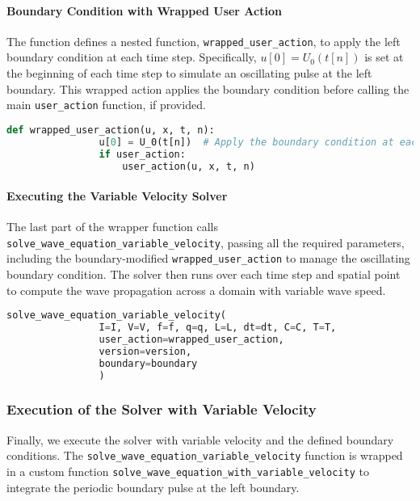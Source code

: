 \documentclass{article}
\begin{document}
		\paragraph{Boundary Condition with Wrapped User Action}
		
		The function defines a nested function, \texttt{wrapped\_user\_action}, to apply the left boundary condition at each time step. Specifically, \( u[0] = U_0(t[n]) \) is set at the beginning of each time step to simulate an oscillating pulse at the left boundary. This wrapped action applies the boundary condition before calling the main \texttt{user\_action} function, if provided.
		
		\begin{lstlisting}[language=Python]
			def wrapped_user_action(u, x, t, n):
				u[0] = U_0(t[n])  # Apply the boundary condition at each time step
				if user_action:
					user_action(u, x, t, n)
		\end{lstlisting}
		
		\paragraph{Executing the Variable Velocity Solver}
		
		The last part of the wrapper function calls \texttt{solve\_wave\_equation\_variable\_velocity}, passing all the required parameters, including the boundary-modified \texttt{wrapped\_user\_action} to manage the oscillating boundary condition. The solver then runs over each time step and spatial point to compute the wave propagation across a domain with variable wave speed.
		
		\begin{lstlisting}[language=Python]
			solve_wave_equation_variable_velocity(
				I=I, V=V, f=f, q=q, L=L, dt=dt, C=C, T=T,
				user_action=wrapped_user_action,
				version=version,
				boundary=boundary
				)
		\end{lstlisting}
		
		\newpage
		\subsubsection{Execution of the Solver with Variable Velocity}
		
		Finally, we execute the solver with variable velocity and the defined boundary conditions. The \texttt{solve\_wave\_equation\_variable\_velocity} function is wrapped in a custom function \texttt{solve\_wave\_equation\_with\_variable\_velocity} to integrate the periodic boundary pulse at the left boundary.
		
\end{document}
